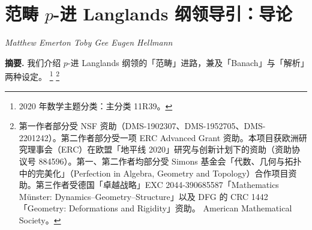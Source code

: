 \chapter{范畴 $p$-进 Langlands 纲领导引：导论}
\begin{center}
{\small\itshape Matthew Emerton \quad Toby Gee \quad Eugen Hellmann}
\end{center}
\medskip
\noindent\textbf{摘要.} 我们介绍 $p$-进 Langlands 纲领的「范畴」进路，兼及「Banach」与「解析」两种设定。
\footnote{2020 年数学主题分类：主分类 11R39。}
\footnote{第一作者部分受 NSF 资助（DMS-1902307、DMS-1952705、DMS-2201242）。第二作者部分受一项 ERC Advanced Grant 资助。本项目获欧洲研究理事会（ERC）在欧盟「地平线 2020」研究与创新计划下的资助（资助协议号 884596）。第一、第二作者均部分受 Simons 基金会「代数、几何与拓扑中的完美化」（Perfection in Algebra, Geometry and Topology）合作项目资助。第三作者受德国「卓越战略」EXC 2044-390685587「Mathematics Münster: Dynamics--Geometry--Structure」以及 DFG 的 CRC 1442「Geometry: Deformations and Rigidity」资助。 American Mathematical Society。}

